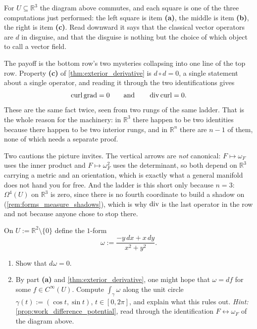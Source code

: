 \begin{importantremark}
\label{rem:one_theorem_four_costumes_forms}
For $U \subseteq \mathbb{R}^3$ the diagram above commutes, and each square is one of the three
computations just performed: the left square is item \textbf{(a)}, the middle is item
\textbf{(b)}, the right is item \textbf{(c)}. Read downward it says that the classical vector
operators are $d$ in disguise, and that the disguise is nothing but the choice of which object to
call a vector field.

The payoff is the bottom row's two mysteries collapsing into one line of the top row. Property
\textbf{(c)} of \cref{thm:exterior_derivative} is $d \circ d = 0$, a single statement about a
single
operator, and reading it through the two identifications gives
\[\operatorname{curl}\operatorname{grad} = 0 \qquad\text{and}\qquad \operatorname{div}\operatorname{curl} = 0.\]
These are the same fact twice, seen from two rungs of the same ladder. That is the whole reason
for the machinery: in $\mathbb{R}^3$ there happen to be two identities because there happen to be
two interior rungs, and in $\mathbb{R}^n$ there are $n-1$ of them, none of which needs a separate
proof.

Two cautions the picture invites. The vertical arrows are \emph{not} canonical: $F \mapsto
\omega_F$ uses the inner product and $F \mapsto \omega_F^2$ uses the determinant, so both depend
on $\mathbb{R}^3$ carrying a metric and an orientation, which is exactly what a general manifold
does not hand you for free. And the ladder is this short only because $n = 3$: $\Omega^4(U)$ on
$\mathbb{R}^3$ is zero, since there is no fourth coordinate to build a shadow on
(\cref{rem:forms_measure_shadows}), which is why $\operatorname{div}$ is the last operator in the row and not
because anyone chose to stop there.
\end{importantremark}

\begin{aiexercise}
\label{ex:ai_angle_form_closed}
On $U := \mathbb{R}^2\setminus\{0\}$ define the $1$-form
\[\omega := \frac{-y\,dx + x\,dy}{x^2+y^2}.\]
\begin{enumerate}[label=\textbf{(\alph*)}]
  \item Show that $d\omega = 0$.
  \item By part \textbf{(a)} and \cref{thm:exterior_derivative}, one might hope that
    $\omega = df$ for some
    $f \in C^\infty(U)$. Compute $\int_\gamma \omega$ along the unit circle
    $\gamma(t) := (\cos t, \sin t)$, $t \in [0,2\pi]$, and explain what this rules out.
    \emph{Hint:} \cref{prop:work_difference_potential}, read through the identification
    $F \leftrightarrow \omega_F$ of the diagram above.
\end{enumerate}
\end{aiexercise}

